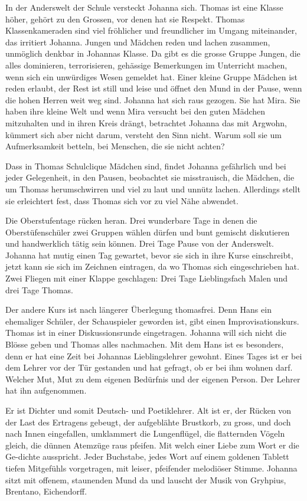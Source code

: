 \documentclass[10pt,titlepage,a5paper]{book}
\begin{document}
In der Anderswelt der Schule versteckt Johanna sich. Thomas ist eine Klasse höher, gehört zu den Grossen, vor denen hat sie Respekt. Thomas Klassenkameraden sind viel fröhlicher und freundlicher im Umgang miteinander, das irritiert Johanna. Jungen und Mädchen reden und lachen zusammen, unmöglich denkbar in Johannas Klasse. Da gibt es die grosse Gruppe Jungen, die alles dominieren, terrorisieren, gehässige Bemerkungen im Unterricht machen, wenn sich ein unwürdiges Wesen gemeldet hat. Einer kleine Gruppe Mädchen ist reden erlaubt, der Rest ist still und leise und öffnet den Mund in der Pause, wenn die hohen Herren weit weg sind. Johanna hat sich raus gezogen. Sie hat Mira. Sie haben ihre kleine Welt und wenn Mira versucht bei den guten Mädchen mitzuhalten und in ihren Kreis drängt, betrachtet Johanna das mit Argwohn, kümmert sich aber nicht darum, versteht den Sinn nicht. Warum soll sie um Aufmerksamkeit betteln, bei Menschen, die sie nicht achten?

 Dass in Thomas Schulclique Mädchen sind, findet Johanna gefähr\-lich und bei jeder Gelegenheit, in den Pausen, beobachtet sie misstrauisch, die Mädchen, die um Thomas herumschwirren und viel zu laut und unnütz lachen. Allerdings stellt sie erleichtert fest, dass Thomas sich vor zu viel Nähe abwendet. 
 
Die Oberstufentage rücken heran. Drei wunderbare Tage in denen die Oberstüfenschüler zwei Gruppen wählen dürfen und bunt gemischt diskutieren und handwerklich tätig sein können. Drei Tage Pause von der Anderswelt. Johanna hat mutig einen Tag gewartet, bevor sie sich in ihre Kurse einschreibt, jetzt kann sie sich im Zeichnen eintragen, da wo Thomas sich eingeschrieben hat. Zwei Fliegen mit einer Klappe geschlagen: Drei Tage Lieblingsfach Malen und drei Tage Thomas.

Der andere Kurs ist nach längerer Überlegung thomasfrei. Denn Hans ein ehemaliger Schüler, der Schauspieler geworden ist, gibt einen Improvisationskurs. Thomas ist in einer Diskussionsrunde eingetragen. Johanna will sich nicht die Blösse geben und Thomas alles nachmachen. 
Mit dem Hans ist es besonders, denn er hat eine Zeit bei Johannas Lieblingslehrer gewohnt. Eines Tages ist er bei dem Lehrer vor der Tür gestanden und hat gefragt, ob er bei ihm wohnen darf. Welcher Mut, Mut zu dem eigenen Bedürfnis und der eigenen Person. Der Lehrer hat ihn aufgenommen. 

Er ist Dichter und somit Deutsch- und Poetiklehrer. Alt ist er, der Rücken von der Last des Ertragens gebeugt, der aufgeblähte Brustkorb, zu gross, und doch nach Innen eingefallen, umklammert die Lungenflügel, die flatternden Vögeln gleich, die dünnen Atemzüge raus pfeifen. Mit welch einer Liebe zum Wort er die Ge-dichte ausspricht. Jeder Buchstabe, jedes Wort auf einem goldenen Tablett tiefen Mitgefühls vorgetragen, mit leiser, pfeifender melodiöser Stimme. Johanna sitzt mit offenem, staunenden Mund da und lauscht der Musik von Gryhpius, Brentano, Eichendorff.
\end{document}
